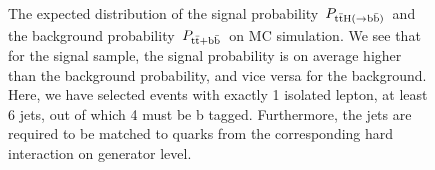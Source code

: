 \begin{figure}
\begin{centering}
\\
\caption{The expected distribution of the signal probability~$P_{\mathrm{t} \bar{\mathrm{t}} \mathrm{H} (\rightarrow \mathrm{b}\bar{\mathrm{b}})}$~and the background probability~$P_{\mathrm{t} \bar{\mathrm{t}} + \mathrm{b}\bar{\mathrm{b}}}$~on MC simulation. We see that for the signal sample, the signal probability is on average higher than the background probability, and vice versa for the background. Here, we have selected events with exactly 1 isolated lepton, at least 6 jets, out of which 4 must be b tagged. Furthermore, the jets are required to be matched to quarks from the corresponding hard interaction on generator level.}
\label{fig:mem_proba}
\end{centering}
\end{figure}


